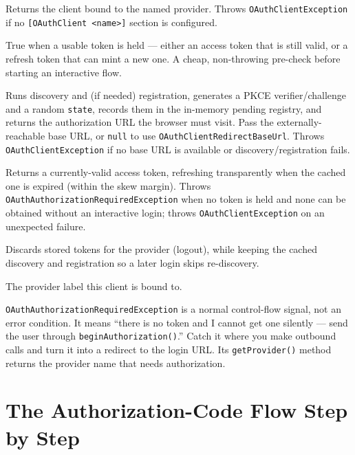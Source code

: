 \begin{description}[style=nextline]
  \item[\texttt{static OAuthClient forProvider(String name)}]  Returns the client bound to the named provider.  Throws \texttt{OAuthClientException} if no \texttt{[OAuthClient <name>]} section is configured.
  \item[\texttt{boolean isAuthorized()}]  True when a usable token is held --- either an access token that is still valid, or a refresh token that can mint a new one.  A cheap, non-throwing pre-check before starting an interactive flow.
  \item[\texttt{String beginAuthorization(String redirectBaseUrl)}]  Runs discovery and (if needed) registration, generates a PKCE verifier/challenge and a random \texttt{state}, records them in the in-memory pending registry, and returns the authorization URL the browser must visit.  Pass the externally-reachable base URL, or \texttt{null} to use \texttt{OAuthClientRedirectBaseUrl}.  Throws \texttt{OAuthClientException} if no base URL is available or discovery/registration fails.
  \item[\texttt{String getAccessToken()}]  Returns a currently-valid access token, refreshing transparently when the cached one is expired (within the skew margin).  Throws \texttt{OAuthAuthorizationRequiredException} when no token is held and none can be obtained without an interactive login; throws \texttt{OAuthClientException} on an unexpected failure.
  \item[\texttt{void clearTokens()}]  Discards stored tokens for the provider (logout), while keeping the cached discovery and registration so a later login skips re-discovery.
  \item[\texttt{String getProviderName()}]  The provider label this client is bound to.
\end{description}

\begin{tipbox}
\texttt{OAuthAuthorizationRequiredException} is a normal control-flow signal, not an error condition.  It means ``there is no token and I cannot get one silently --- send the user through \texttt{beginAuthorization()}.''  Catch it where you make outbound calls and turn it into a redirect to the login URL.  Its \texttt{getProvider()} method returns the provider name that needs authorization.
\end{tipbox}

\section{The Authorization-Code Flow Step by Step}
\label{sec:oc-flow}

